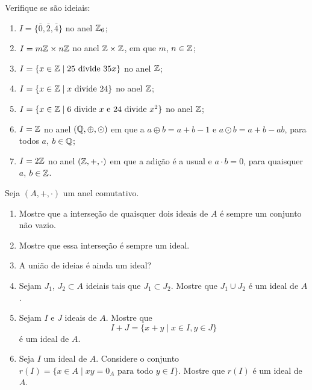 \documentclass[12pt]{exam}
\begin{document}
    \questao{} Verifique se s\~ao ideiais:
    \begin{enumerate}[label=({\alph*})]
        \item  $I = \{\overline{0}, \overline{2}, \overline{4}\}$ no anel $\mathbb{Z}_6$;

        \item $I = m\mathbb{Z} \times n\mathbb{Z}$ no anel $\mathbb{Z} \times \mathbb{Z}$, em que $m$, $n \in \mathbb{Z}$;

        \item $I = \{x \in \mathbb{Z} \mid 25 \mbox{ divide } 35x\}$ no anel $\mathbb{Z}$;

        \item $I = \{x \in \mathbb{Z} \mid x \mbox{ divide } 24\}$ no anel $\mathbb{Z}$;

        \item $I = \{x \in \mathbb{Z} \mid 6 \mbox{ divide } x \mbox{ e } 24 \mbox{ divide } x^2\}$ no anel $\mathbb{Z}$;

        \item $I = \mathbb{Z}$ no anel $(\mathbb{Q}, \oplus, \odot)$ em que a $a \oplus b = a + b - 1$ e $a \odot b = a + b - ab$, para todos $a$, $b \in \mathbb{Q}$;

        \item $I = 2\mathbb{Z}$ no anel $(\mathbb{Z}, +, \cdot)$ em que a adi\c{c}\~ao \'e a usual e $a \cdot b = 0$, para quaisquer $a$, $b \in \mathbb{Z}$.
    \end{enumerate}

    \vspace{.3cm}

    \questao{} Seja $(A, +, \cdot)$ um anel comutativo.
    \begin{enumerate}[label=({\alph*})]
        \item Mostre que a interse\c{c}\~ao de quaisquer dois ideais de $A$ \'e sempre um conjunto n\~ao vazio.

        \item Mostre que essa interse\c{c}\~ao \'e sempre um ideal.

        \item A uni\~ao de ideias \'e ainda um ideal?

        \item Sejam $J_1$, $J_2 \subset A$ ideiais tais que $J_1 \subset J_2$. Mostre que $J_1 \cup J_2$ \'e um ideal de $A$.

        \item Sejam $I$ e $J$ ideais de $A$. Mostre que
        \[
            I + J = \{x + y \mid x \in I, y \in J\}
        \]
        \'e um ideal de $A$.

    \item Seja $I$ um ideal de $A$. Considere o conjunto $r(I) = \{x \in A \mid xy = 0_A \mbox{ para todo } y \in I\}$. Mostre que
        $r(I)$ é um ideal de $A$.
    \end{enumerate}
\end{document}
